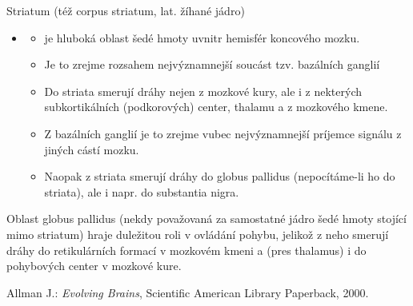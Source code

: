 \documentclass[journal,onecolumn]{IEEEtrancz}
\begin{document}
Striatum (též corpus striatum, lat. žíhané jádro) 
\begin{itemize}
	\item 
	\begin{itemize}
		\item je hluboká oblast šedé hmoty uvnitr hemisfér koncového mozku. 
		\item Je to zrejme rozsahem nejvýznamnejší soucást tzv. bazálních ganglií
			\vspace{3mm}
		\item Do striata smerují dráhy nejen z mozkové kury, ale i z nekterých subkortikálních (podkorových) center, thalamu a z mozkového kmene. 
		\item Z bazálních ganglií je to zrejme vubec nejvýznamnejší príjemce signálu z jiných cástí mozku. 
		\item Naopak z striata smerují dráhy do globus pallidus (nepocítáme-li ho do striata), ale i napr. do substantia nigra.
			\vspace{3mm}
	\end{itemize}
\end{itemize}
Oblast globus pallidus (nekdy považovaná za samostatné jádro šedé hmoty stojící mimo striatum) hraje duležitou roli v ovládání pohybu, jelikož z neho smerují dráhy do retikulárních formací v mozkovém kmeni a (pres thalamus) i do pohybových center v mozkové kure. 

		
\begin{literatura}{1}

Allman J.: \emph{Evolving Brains}, Scientific American Library Paperback, 2000.

\end{literatura}
\end{document}
